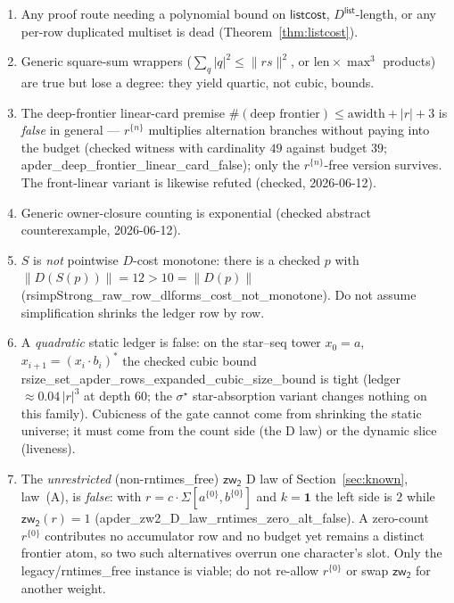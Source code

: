 \documentclass[11pt]{article}
\theoremstyle{remark}
\newcommand{\ONE}{\mathbf{1}}
\newcommand{\rs}[1]{\lvert #1\rvert}                 %
\newcommand{\rss}[1]{\lVert #1\rVert}                %
\newcommand{\seqstar}{\sigma^{\star}}
\newcommand{\Sstrong}{S}
\newcommand{\open}{D}
\newcommand{\Dlist}{D^{\mathsf{list}}}
\newcommand{\listcost}{\mathsf{listcost}}
\newcommand{\thy}[1]{\textsf{\small #1}}
\begin{document}
\begin{enumerate}
\item Any proof route needing a polynomial bound on $\listcost$,
$\Dlist$-length, or any per-row duplicated multiset is dead
(Theorem~\ref{thm:listcost}).
\item Generic square-sum wrappers
($\sum_q \rs{q}^{2}\le\rss{rs}^{2}$, or $\mathrm{len}\times\max^{3}$
products) are true but lose a degree: they yield quartic, not cubic, bounds.
\item The deep-frontier linear-card premise
$\#(\text{deep frontier})\le \mathrm{awidth}+\rs{r}+3$ is \emph{false} in
general --- $r^{\{n\}}$ multiplies alternation branches without paying into
the budget (checked witness with cardinality $49$ against budget $39$;
\thy{apder\_deep\_frontier\_linear\_card\_false}); only the
$r^{\{n\}}$-free version survives.  The front-linear variant is likewise
refuted (checked, 2026-06-12).
\item Generic owner-closure counting is exponential (checked abstract
counterexample, 2026-06-12).
\item $\Sstrong$ is \emph{not} pointwise $\open$-cost monotone: there is a
checked $p$ with
$\rss{\open(\Sstrong(p))} = 12 > 10 = \rss{\open(p)}$
(\thy{rsimpStrong\_raw\_row\_dlforms\_cost\_not\_monotone}).  Do not assume
simplification shrinks the ledger row by row.
\item A \emph{quadratic} static ledger is false: on the star--seq tower
$x_{0}=a$, $x_{i+1}=(x_{i}\cdot b_{i})^{*}$ the checked cubic bound
\thy{rsize\_set\_apder\_rows\_expanded\_cubic\_size\_bound} is tight
(ledger $\approx 0.04\,\rs{r}^{3}$ at depth 60; the $\seqstar$
star-absorption variant changes nothing on this family).  Cubicness of the
gate cannot come from shrinking the static universe; it must come from the
count side (the D law) or the dynamic slice (liveness).
\item The \emph{unrestricted} (non-\thy{rntimes\_free}) $\mathsf{zw_2}$ D law of
Section~\ref{sec:known}, law~(A), is \emph{false}: with
$r=c\cdot\Sigma[a^{\{0\}},b^{\{0\}}]$ and $k=\ONE$ the left side is $2$ while
$\mathsf{zw_2}(r)=1$
(\thy{apder\_zw2\_D\_law\_rntimes\_zero\_alt\_false}).  A zero-count
$r^{\{0\}}$ contributes no accumulator row and no budget yet remains a distinct
frontier atom, so two such alternatives overrun one character's slot.  Only the
legacy/\thy{rntimes\_free} instance is viable; do not re-allow $r^{\{0\}}$ or
swap $\mathsf{zw_2}$ for another weight.
\end{enumerate}
\end{document}
